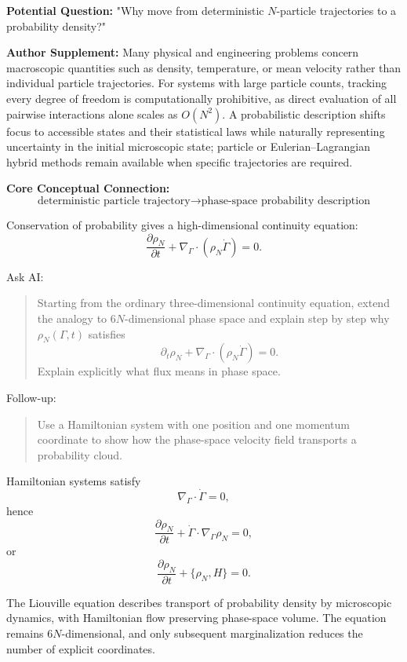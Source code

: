 \begin{authornote}
\textbf{Potential Question:}
"Why move from deterministic \(N\)-particle trajectories to a probability density?"

\textbf{Author Supplement:}
Many physical and engineering problems concern macroscopic quantities such as density, temperature, or mean velocity rather than individual particle trajectories. For systems with large particle counts, tracking every degree of freedom is computationally prohibitive, as direct evaluation of all pairwise interactions alone scales as $O(N^2)$. A probabilistic description shifts focus to accessible states and their statistical laws while naturally representing uncertainty in the initial microscopic state; particle or Eulerian--Lagrangian hybrid methods remain available when specific trajectories are required.

\textbf{Core Conceptual Connection:}
\[
\text{deterministic particle trajectory}
\longrightarrow
\text{phase-space probability description}
\]
\end{authornote}

Conservation of probability gives a high-dimensional continuity equation:
\[
\frac{\partial \rho_N}{\partial t}
+
\nabla_\Gamma\cdot(\rho_N\dot\Gamma)=0.
\]

\begin{askai}
Ask AI:
\begin{quote}
Starting from the ordinary three-dimensional continuity equation, extend the analogy to \(6N\)-dimensional phase space and explain step by step why \(\rho_N(\Gamma,t)\) satisfies
\[
\partial_t\rho_N+\nabla_\Gamma\cdot(\rho_N\dot\Gamma)=0.
\]
Explain explicitly what flux means in phase space.
\end{quote}

Follow-up:
\begin{quote}
Use a Hamiltonian system with one position and one momentum coordinate to show how the phase-space velocity field transports a probability cloud.
\end{quote}
\end{askai}

Hamiltonian systems satisfy
\[
\nabla_\Gamma\cdot\dot\Gamma=0,
\]
hence
\[
\frac{\partial \rho_N}{\partial t}
+
\dot\Gamma\cdot\nabla_\Gamma\rho_N=0,
\]
or
\[
\frac{\partial \rho_N}{\partial t}+\{\rho_N,H\}=0.
\]

The Liouville equation describes transport of probability density by microscopic dynamics, with Hamiltonian flow preserving phase-space volume. The equation remains \(6N\)-dimensional, and only subsequent marginalization reduces the number of explicit coordinates.

